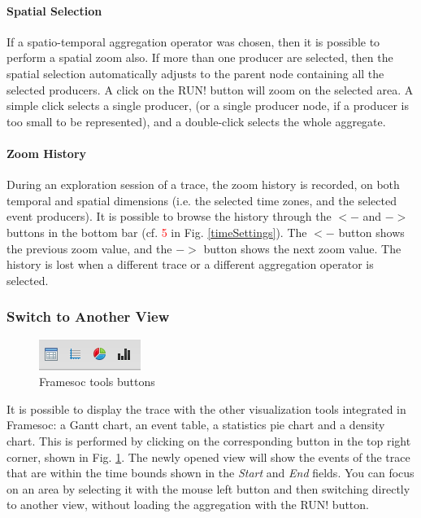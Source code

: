 \documentclass[twoside]{article}
\begin{document}
\begin{sloppypar}
\paragraph{Spatial Selection}
If a spatio-temporal aggregation operator was chosen, then it is possible to perform a spatial zoom also. If more than one producer are selected, then the spatial selection automatically adjusts to the parent node containing all the selected producers. A click on the RUN! button will zoom on the selected area. A simple click selects a single producer, (or a single producer node, if a producer is too small to be represented), and a double-click selects the whole aggregate.

\paragraph{Zoom History}
\label{zHistory}
During an exploration session of a trace, the zoom history is recorded, on both temporal and spatial dimensions (i.e. the selected time zones, and the selected event producers). It is possible to browse the history through the $<-$ and $->$ buttons in the bottom bar (cf. \textcolor{red}{5} in Fig. \ref{timeSettings}). The $<-$ button shows the previous zoom value, and the $->$ button shows the next zoom value. The history is lost when a different trace or a different aggregation operator is selected.

\subsubsection{Switch to Another View}
\begin{figure}[h!]
	\centering
	\includegraphics[scale=1.0]{images/framesoc_buttons.png}
	\caption{Framesoc tools buttons}
	\label{framesocTools}
\end{figure}
It is possible to display the trace with the other visualization tools integrated in Framesoc: a Gantt chart, an event table, a statistics pie chart and a density chart. This is performed by clicking on the corresponding button in the top right corner, shown in Fig. \ref{framesocTools}. The newly opened view will show the events of the trace that are within the time bounds shown in the \textit{Start} and \textit{End} fields. You can focus on an area by selecting it with the mouse left button and then switching directly to another view, without loading the aggregation with the RUN! button. 


\end{sloppypar}
\end{document}
